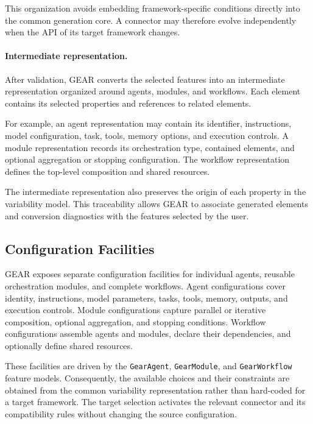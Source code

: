 This organization avoids embedding framework-specific conditions directly into
the common generation core. A connector may therefore evolve independently when
the API of its target framework changes.


\paragraph{\textbf{Intermediate representation.}}
After validation, GEAR converts the selected features into an intermediate
representation organized around agents, modules, and workflows. Each element
contains its selected properties and references to related elements.

For example, an agent representation may contain its identifier, instructions,
model configuration, task, tools, memory options, and execution controls. A
module representation records its orchestration type, contained elements, and
optional aggregation or stopping configuration. The workflow representation
defines the top-level composition and shared resources.

The intermediate representation also preserves the origin of each property in
the variability model. This traceability allows GEAR to associate generated
elements and conversion diagnostics with the features selected by the user.

\subsection{Configuration Facilities}
\label{subsec:configuration-facilities}

GEAR exposes separate configuration facilities for individual agents, reusable
orchestration modules, and complete workflows. Agent configurations cover
identity, instructions, model parameters, tasks, tools, memory, outputs, and
execution controls. Module configurations capture parallel or iterative
composition, optional aggregation, and stopping conditions. Workflow
configurations assemble agents and modules, declare their dependencies, and
optionally define shared resources.

These facilities are driven by the \texttt{GearAgent},
\texttt{GearModule}, and \texttt{GearWorkflow} feature models. Consequently,
the available choices and their constraints are obtained from the common
variability representation rather than hard-coded for a target framework. The
target selection activates the relevant connector and its compatibility rules
without changing the source configuration.

